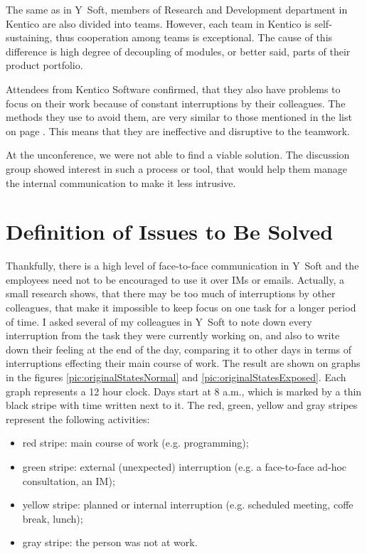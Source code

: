 \documentclass[11pt,singleside]{myfithesis2}
\begin{document}
The same as in Y~Soft, members of Research and Development department in Kentico are also divided into teams. However, each team in Kentico is self-sustaining, thus cooperation among teams is exceptional. The cause of this difference is high degree of decoupling of modules, or better said, parts of their product portfolio.

Attendees from Kentico Software confirmed, that they also have problems to focus on their work because of constant interruptions by their colleagues. The methods they use to avoid them, are very similar to those mentioned in the list on page \pageref{list:avoidingCommunication}. This means that they are ineffective and disruptive to the teamwork.

At the unconference, we were not able to find a viable solution. The discussion group showed interest in such a process or tool, that would help them manage the internal communication to make it less intrusive.


	\section{Definition of Issues to Be Solved}\label{issues}
Thankfully, there is a high level of face-to-face communication in Y~Soft and the employees need not to be encouraged to use it over IMs or emails. Actually, a small research shows, that there may be too much of interruptions by other colleagues, that make it impossible to keep focus on one task for a longer period of time. I asked several of my colleagues in Y~Soft to note down every interruption from the task they were currently working on, and also to write down their feeling at the end of the day, comparing it to other days in terms of interruptions effecting their main course of work. The result are shown on graphs in the figures \ref{pic:originalStatesNormal} and \ref{pic:originalStatesExposed}. Each graph represents a 12 hour clock. Days start at 8 a.m., which is marked by a thin black stripe with time written next to it. The red, green, yellow and gray stripes represent the following activities:
\begin{itemize}
	\item{red stripe:} main course of work (e.g. programming);
	\item{green stripe:} external (unexpected) interruption (e.g. a face-to-face ad-hoc consultation, an IM);
	\item{yellow stripe:} planned or internal interruption (e.g. scheduled meeting, coffe break, lunch);
	\item{gray stripe:} the person was not at work.
\end{itemize}
\end{document}
